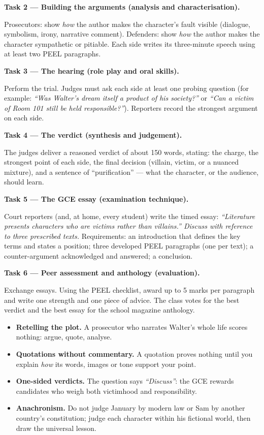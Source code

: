 \documentclass[11pt]{article}
\begin{document}
\textbf{Task 2 — Building the arguments (analysis and characterisation).}\par
Prosecutors: show \emph{how} the author makes the character's fault visible (dialogue, symbolism, irony, narrative comment). Defenders: show \emph{how} the author makes the character sympathetic or pitiable. Each side writes its three-minute speech using at least two PEEL paragraphs.

\textbf{Task 3 — The hearing (role play and oral skills).}\par
Perform the trial. Judges must ask each side at least one probing question (for example: \emph{``Was Walter's dream itself a product of his society?''} or \emph{``Can a victim of Room 101 still be held responsible?''}). Reporters record the strongest argument on each side.

\textbf{Task 4 — The verdict (synthesis and judgement).}\par
The judges deliver a reasoned verdict of about 150 words, stating: the charge, the strongest point of each side, the final decision (villain, victim, or a nuanced mixture), and a sentence of ``purification'' — what the character, or the audience, should learn.

\textbf{Task 5 — The GCE essay (examination technique).}\par
Court reporters (and, at home, every student) write the timed essay: \emph{``Literature presents characters who are victims rather than villains.'' Discuss with reference to three prescribed texts.} Requirements: an introduction that defines the key terms and states a position; three developed PEEL paragraphs (one per text); a counter-argument acknowledged and answered; a conclusion.

\textbf{Task 6 — Peer assessment and anthology (evaluation).}\par
Exchange essays. Using the PEEL checklist, award up to 5 marks per paragraph and write one strength and one piece of advice. The class votes for the best verdict and the best essay for the school magazine anthology.

\begin{attention}
\begin{itemize}
\item \textbf{Retelling the plot.} A prosecutor who narrates Walter's whole life scores nothing: argue, quote, analyse.
\item \textbf{Quotations without commentary.} A quotation proves nothing until you explain \emph{how} its words, images or tone support your point.
\item \textbf{One-sided verdicts.} The question says \emph{``Discuss''}: the GCE rewards candidates who weigh both victimhood and responsibility.
\item \textbf{Anachronism.} Do not judge January by modern law or Sam by another country's constitution; judge each character within his fictional world, then draw the universal lesson.
\end{itemize}
\end{attention}
\end{document}
